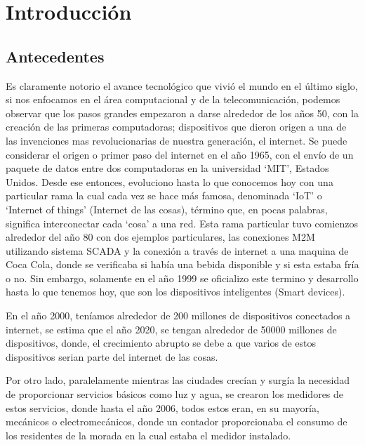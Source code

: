 \chapter{Introducción}
\section{Antecedentes}
Es claramente notorio el avance tecnológico que vivió el mundo en el último siglo, si nos
enfocamos en el área computacional y de la telecomunicación, podemos observar que
los pasos grandes empezaron a darse alrededor de los años 50, con la creación de las
primeras computadoras; dispositivos que dieron origen a una de las invenciones mas
revolucionarias de nuestra generación, el internet.
Se puede considerar el origen o primer paso del internet en el año 1965, con el envío de
un paquete de datos entre dos computadoras en la universidad ‘MIT’, Estados Unidos.\cite{livescience}
Desde ese entonces, evoluciono hasta lo que conocemos hoy con una particular rama la
cual cada vez se hace más famosa, denominada ‘IoT’ o ‘Internet of things’ (Internet de
las cosas), término que, en pocas palabras, significa interconectar cada ‘cosa’ a una red.
Esta rama particular tuvo comienzos alrededor del año 80 con dos ejemplos particulares,
las conexiones M2M utilizando sistema SCADA y la conexión a través de internet a una
maquina de Coca Cola, donde se verificaba si había una bebida disponible y si esta
estaba fría o no. Sin embargo, solamente en el año 1999 se oficializo este termino y
desarrollo hasta lo que tenemos hoy, que son los dispositivos inteligentes (Smart devices).\cite{footekeithd.2016}

En el año 2000, teníamos alrededor de 200 millones de dispositivos conectados a internet,
se estima que el año 2020, se tengan alrededor de 50000 millones de dispositivos, donde,
el crecimiento abrupto se debe a que varios de estos dispositivos serian parte del internet
de las cosas.\cite{ccna}

Por otro lado, paralelamente mientras las ciudades crecían y surgía la necesidad de
proporcionar servicios básicos como luz y agua, se crearon los medidores de estos
servicios, donde hasta el año 2006, todos estos eran, en su mayoría, mecánicos o
electromecánicos, donde un contador proporcionaba el consumo de los residentes de la
morada en la cual estaba el medidor instalado.

